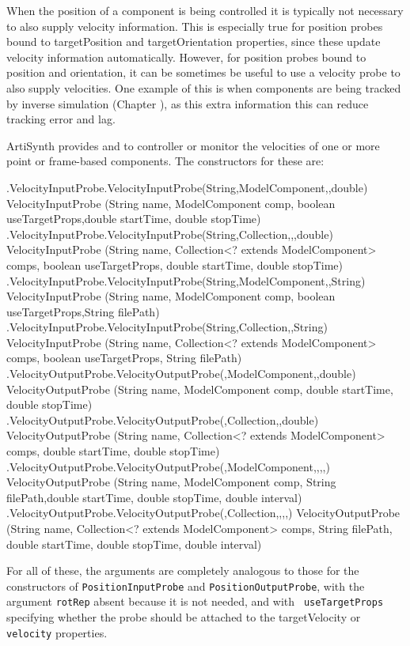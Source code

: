 When the position of a component is being controlled it is typically not
necessary to also supply velocity information. This is especially true for
position probes bound to {\sf targetPosition} and {\sf targetOrientation}
properties, since these update velocity information automatically. However, for
position probes bound to {\sf position} and {\sf orientation}, it can be
sometimes be useful to use a velocity probe to also supply velocities.  One
example of this is when components are being tracked by inverse simulation
(Chapter
\cite{InverseSimulation:sec}), as this extra information this can reduce
tracking error and lag.

ArtiSynth provides 
 and
to controller or monitor the velocities of one or more point or frame-based
components. The constructors for these are:
%
\begin{methodtable}{0.9}{0.1}
\midline
%
\methodentry
{\probes.VelocityInputProbe.VelocityInputProbe(String,ModelComponent,,double)}%
{VelocityInputProbe (String name, ModelComponent comp, 
boolean useTargetProps,\brh double startTime, double stopTime)}%
{\ }%
%
\methodspace{0.5em}%
\methodentry
{\probes.VelocityInputProbe.VelocityInputProbe(String,Collection,,,double)}%
{VelocityInputProbe (String name, Collection<? extends ModelComponent> comps,\brh
boolean useTargetProps, double startTime, double stopTime)}%
{\ }%
%
\methodspace{0.5em}%
\methodentry
{\probes.VelocityInputProbe.VelocityInputProbe(String,ModelComponent,,String)}%
{VelocityInputProbe (String name, ModelComponent comp,
boolean useTargetProps,\brh String filePath)}%
{\ }%
%
\methodspace{0.5em}%
\methodentry
{\probes.VelocityInputProbe.VelocityInputProbe(String,Collection,,String)}%
{VelocityInputProbe (String name, Collection<? extends ModelComponent> comps,\brh
boolean useTargetProps, String filePath)}%
{\ }%
\methodspace{1.05em}%
\methodentry
{\probes.VelocityOutputProbe.VelocityOutputProbe(,ModelComponent,,double)}%
{VelocityOutputProbe (String name, ModelComponent comp,\brh
double startTime, double stopTime)}%
{\ }%
%
\methodspace{0.5em}%
\methodentry
{\probes.VelocityOutputProbe.VelocityOutputProbe(,Collection,,double)}%
{VelocityOutputProbe (String name, Collection<? extends ModelComponent> comps,\brh
double startTime, double stopTime)}%
{\ }%
%
\methodspace{0.5em}%
\methodentry
{\probes.VelocityOutputProbe.VelocityOutputProbe(,ModelComponent,,,,)}%
{VelocityOutputProbe (String name, ModelComponent comp,
String filePath,\brh double startTime, double stopTime, double interval)}%
{\ }%
%
\methodspace{0.5em}%
\methodentry
{\probes.VelocityOutputProbe.VelocityOutputProbe(,Collection,,,,)}%
{VelocityOutputProbe (String name, Collection<? extends ModelComponent> comps,\brh
String filePath, double startTime, double stopTime, 
double interval)}%
{\ }%
\midline
\end{methodtable}
%
For all of these, the arguments are completely analogous to those for the
constructors of {\tt PositionInputProbe} and {\tt PositionOutputProbe}, with
the argument {\tt rotRep} absent because it is not needed, and with {\tt
useTargetProps} specifying whether the probe should be attached to the {\sf
targetVelocity} or {\tt velocity} properties.

